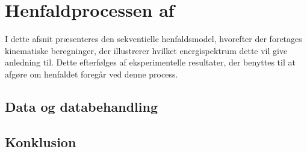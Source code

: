 \chapter{Henfaldprocessen af \Carb}
\label{cha:sekventielt-henfald}
I dette afsnit præsenteres den sekventielle henfaldsmodel, hvorefter der foretages kinematiske
beregninger, der illustrerer hvilket energispektrum dette vil give anledning til. Dette efterfølges
af eksperimentelle resultater, der benyttes til at afgøre om henfaldet foregår ved denne process.  








\section{Data og databehandling}
\label{sec:sek-data}





\section{Konklusion}
\label{sec:sekv-konklusion}


